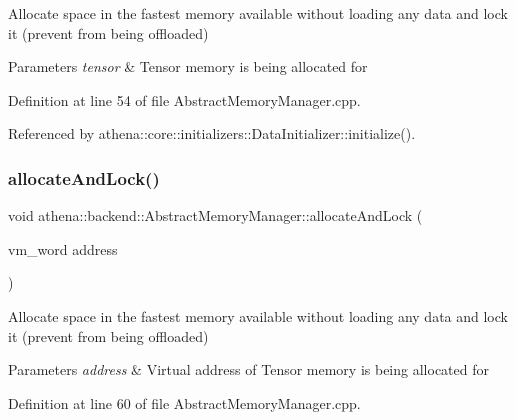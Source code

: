 Allocate space in the fastest memory available without loading any data and lock it (prevent from being offloaded) 
\begin{DoxyParams}{Parameters}
{\em tensor} & Tensor memory is being allocated for \\
\hline
\end{DoxyParams}


Definition at line 54 of file Abstract\+Memory\+Manager.\+cpp.



Referenced by athena\+::core\+::initializers\+::\+Data\+Initializer\+::initialize().

\mbox{\label{classathena_1_1backend_1_1_abstract_memory_manager_ab5305b3d1ab91960bf179ce0be166120}} 
\subsubsection{\texorpdfstring{allocate\+And\+Lock()}{allocateAndLock()}\hspace{0.1cm}{\footnotesize\ttfamily [2/3]}}
{\footnotesize\ttfamily void athena\+::backend\+::\+Abstract\+Memory\+Manager\+::allocate\+And\+Lock (\begin{DoxyParamCaption}\item[{vm\+\_\+word}]{address }\end{DoxyParamCaption})}

Allocate space in the fastest memory available without loading any data and lock it (prevent from being offloaded) 
\begin{DoxyParams}{Parameters}
{\em address} & Virtual address of Tensor memory is being allocated for \\
\hline
\end{DoxyParams}


Definition at line 60 of file Abstract\+Memory\+Manager.\+cpp.

\mbox{\label{classathena_1_1backend_1_1_abstract_memory_manager_a1b80008e94c21d5ac87f9a45d3f212a8}} 
